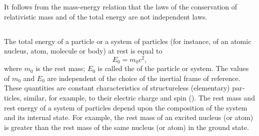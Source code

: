 It follows from the mass-energy relation that the laws of the conservation of relativistic mass  and of the total energy are not independent laws.

\subsection{}\label{5.7.3} The total energy of a particle or a system of particles (for instance, of an atomic nucleus, atom, molecule or body) at rest is equal to
\begin{equation*}%
E_{0} = m_{0}c^{2},
\end{equation*}
where $m_{0}$ is the rest mass; $E_{0}$ is called the  of the particle or system. The values of $m_{0}$ and $E_{0}$ are independent of the choice of the inertial frame of reference. These quantities are constant characteristics of structureless (elementary) par­ticles, similar, for example, to their electric charge and spin (). The rest mass and rest energy of a system of par­ticles depend upon the composition of the system and its inter­nal state. For example, the rest mass of an excited nucleus (or atom) is greater than the rest mass of the same nucleus (or atom) in the ground state.

